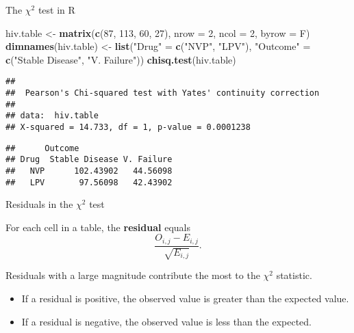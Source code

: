 \documentclass[
  ignorenonframetext,
  aspectratio=169]{beamer}
\newenvironment{Shaded}{\begin{snugshade}}{\end{snugshade}}
\newcommand{\AttributeTok}[1]{\textcolor[rgb]{0.13,0.29,0.53}{#1}}
\newcommand{\DecValTok}[1]{\textcolor[rgb]{0.00,0.00,0.81}{#1}}
\newcommand{\FunctionTok}[1]{\textcolor[rgb]{0.13,0.29,0.53}{\textbf{#1}}}
\newcommand{\NormalTok}[1]{#1}
\newcommand{\OtherTok}[1]{\textcolor[rgb]{0.56,0.35,0.01}{#1}}
\newcommand{\SpecialCharTok}[1]{\textcolor[rgb]{0.81,0.36,0.00}{\textbf{#1}}}
\newcommand{\StringTok}[1]{\textcolor[rgb]{0.31,0.60,0.02}{#1}}
\begin{document}
\begin{frame}[fragile]{The \(\chi^2\) test in \textsf{R}}
\protect\hypertarget{the-chi2-test-in}{}
\scriptsize

\begin{Shaded}
\begin{Highlighting}[]
\NormalTok{hiv.table }\OtherTok{\textless{}{-}} \FunctionTok{matrix}\NormalTok{(}\FunctionTok{c}\NormalTok{(}\DecValTok{87}\NormalTok{, }\DecValTok{113}\NormalTok{, }\DecValTok{60}\NormalTok{, }\DecValTok{27}\NormalTok{), }\AttributeTok{nrow =} \DecValTok{2}\NormalTok{, }\AttributeTok{ncol =} \DecValTok{2}\NormalTok{, }\AttributeTok{byrow =}\NormalTok{ F)}
\FunctionTok{dimnames}\NormalTok{(hiv.table) }\OtherTok{\textless{}{-}} \FunctionTok{list}\NormalTok{(}\StringTok{"Drug"} \OtherTok{=} \FunctionTok{c}\NormalTok{(}\StringTok{"NVP"}\NormalTok{, }\StringTok{"LPV"}\NormalTok{),}
                           \StringTok{"Outcome"} \OtherTok{=} \FunctionTok{c}\NormalTok{(}\StringTok{"Stable Disease"}\NormalTok{, }\StringTok{"V. Failure"}\NormalTok{))}
\FunctionTok{chisq.test}\NormalTok{(hiv.table)}
\end{Highlighting}
\end{Shaded}

\begin{verbatim}
## 
##  Pearson's Chi-squared test with Yates' continuity correction
## 
## data:  hiv.table
## X-squared = 14.733, df = 1, p-value = 0.0001238
\end{verbatim}

\begin{Shaded}
\end{Shaded}

\begin{verbatim}
##      Outcome
## Drug  Stable Disease V. Failure
##   NVP      102.43902   44.56098
##   LPV       97.56098   42.43902
\end{verbatim}
\end{frame}

\begin{frame}{Residuals in the \(\chi^2\) test}
\protect\hypertarget{residuals-in-the-chi2-test}{}
\small

For each cell in a table, the \textbf{residual} equals
\[\dfrac{O_{i, j} - E_{i, j}}{\sqrt{E_{i,j}}}. \]

Residuals with a large magnitude contribute the most to the \(\chi^2\)
statistic.

\begin{itemize}
\item
  If a residual is positive, the observed value is greater than the
  expected value.
\item
  If a residual is negative, the observed value is less than the
  expected.
\end{itemize}
\end{frame}
\end{document}
